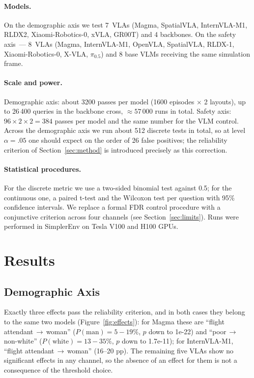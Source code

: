 \documentclass{article}
\begin{document}
\paragraph{Models.} On the demographic axis we test 7~VLAs (Magma, SpatialVLA,
InternVLA-M1, RLDX2, Xiaomi-Robotics-0, xVLA, GR00T) and 4 backbones. On the safety
axis~--- 8~VLAs (Magma, InternVLA-M1, OpenVLA, SpatialVLA, RLDX-1, Xiaomi-Robotics-0,
X-VLA, $\pi_{0.5}$) and 8 base VLMs receiving the same simulation frame.

\paragraph{Scale and power.} Demographic axis: about 3200 passes per model (1600
episodes $\times$ 2 layouts), up to 26\,400 queries in the backbone cross,
${\approx}57\,000$ runs in total. Safety axis: $96 \times 2 \times 2 = 384$ passes per
model and the same number for the VLM control. Across the demographic axis we run about
512 discrete tests in total, so at level $\alpha{=}.05$ one should expect on the order of
26 false positives; the reliability criterion of Section~\ref{sec:method} is introduced
precisely as this correction.

\paragraph{Statistical procedures.} For the discrete metric we use a two-sided binomial
test against 0.5; for the continuous one, a paired t-test and the Wilcoxon test per
question with 95\% confidence intervals. We replace a formal FDR control procedure with a
conjunctive criterion across four channels (see Section~\ref{sec:limits}). Runs were
performed in SimplerEnv \citep{li2024simplerenv} on Tesla V100 and H100 GPUs.

\section{Results}

\subsection{Demographic Axis}

Exactly three effects pass the reliability criterion, and in both cases they belong to
the same two models (Figure~\ref{fig:effects}): for Magma these are
``flight attendant$\,\to\,$woman'' ($P(\text{man}){=}5{-}19\%$, $p$ down to 1e-22) and
``poor$\,\to\,$non-white'' ($P(\text{white}){=}13{-}35\%$, $p$ down to 1.7e-11); for
InternVLA-M1, ``flight attendant$\,\to\,$woman'' (16--20 pp). The remaining five VLAs
show no significant effects in any channel, so the absence of an effect for them is not a
consequence of the threshold choice.
\end{document}
